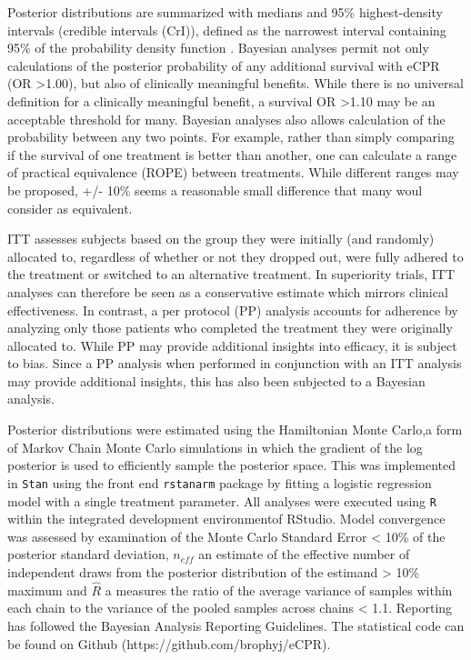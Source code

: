 \documentclass[
  super,
  preprint,
  3p]{elsarticle}
\begin{document}
Posterior distributions are summarized with medians and 95\%
highest-density intervals (credible intervals (CrI)), defined as the
narrowest interval containing 95\% of the probability density function
\citep{mcelreath2020}. Bayesian analyses permit not only calculations of
the posterior probability of any additional survival with eCPR (OR
\textgreater1.00), but also of clinically meaningful benefits. While
there is no universal definition for a clinically meaningful benefit, a
survival OR \textgreater1.10 may be an acceptable threshold for many.
Bayesian analyses also allows calculation of the probability between any
two points. For example, rather than simply comparing if the survival of
one treatment is better than another, one can calculate a range of
practical equivalence (ROPE) between treatments. While different ranges
may be proposed, +/- 10\% seems a reasonable small difference that many
woul consider as equivalent.

ITT assesses subjects based on the group they were initially (and
randomly) allocated to, regardless of whether or not they dropped out,
were fully adhered to the treatment or switched to an alternative
treatment. In superiority trials, ITT analyses can therefore be seen as
a conservative estimate which mirrors clinical effectiveness. In
contrast, a per protocol (PP) analysis accounts for adherence by
analyzing only those patients who completed the treatment they were
originally allocated to. While PP may provide additional insights into
efficacy, it is subject to bias. Since a PP analysis when performed in
conjunction with an ITT analysis may provide additional insights, this
has also been subjected to a Bayesian analysis.

Posterior distributions were estimated using the Hamiltonian Monte
Carlo,a form of Markov Chain Monte Carlo simulations in which the
gradient of the log posterior is used to efficiently sample the
posterior space. This was implemented in \texttt{Stan}\citep{stan} using
the front end \texttt{rstanarm} package\citep{rstanarm} by fitting a
logistic regression model with a single treatment parameter. All
analyses were executed using \texttt{R}\citep{R} within the integrated
development environmentof RStudio\citep{Rstudio}. Model convergence was
assessed by examination of the Monte Carlo Standard Error \textless{}
10\% of the posterior standard deviation, \(n_{eff}\) an estimate of the
effective number of independent draws from the posterior distribution of
the estimand \textgreater{} 10\% maximum and \(\hat{R}\) a measures the
ratio of the average variance of samples within each chain to the
variance of the pooled samples across chains \textless{} 1.1. Reporting
has followed the Bayesian Analysis Reporting Guidelines\citep{RN6637}.
The statistical code can be found on Github
(https://github.com/brophyj/eCPR).
\end{document}
